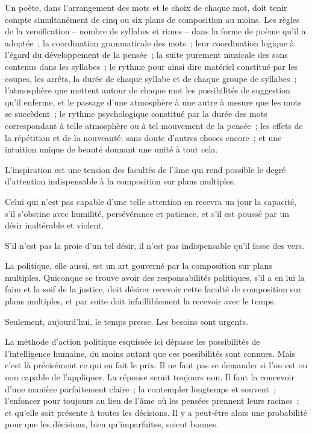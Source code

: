 \documentclass[french,twoside]{book} %
\begin{document}
Un poète, dans l'arrangement des mots et le choix de chaque mot, doit tenir compte simultanément de cinq ou six plans de composition au moins. Les règles de la versification – nombre de syllabes et rimes – dans la forme de poème qu'il a adoptée ; la coordination grammaticale des mots ; leur coordination logique à l'égard du développement de la pensée ; la suite purement musicale des sons contenus dans les syllabes ; le rythme pour ainsi dire matériel constitué par les coupes, les arrêts, la durée de chaque syllabe et de chaque groupe de syllabes ; l'atmosphère que mettent autour de chaque mot les possibilités de suggestion qu'il enferme, et le passage d'une atmosphère à une autre à mesure que les mots se succèdent ; le rythme psychologique constitué par la durée des mots correspondant à telle atmosphère ou à tel mouvement de la pensée ; les effets de la répétition et de la nouveauté; sans doute d'autres choses encore ; et une intuition unique de beauté donnant une unité à tout cela.\par
L'inspiration est une tension des facultés de l'âme qui rend possible le degré d'attention indispensable à la composition sur plans multiples.\par
Celui qui n'est pas capable d'une telle attention en recevra un jour la capacité, s'il s'obstine avec humilité, persévérance et patience, et s'il est poussé par un désir inaltérable et violent.\par
S'il n'est pas la proie d'un tel désir, il n'est pas indispensable qu'il fasse des vers.\par
La politique, elle aussi, est un art gouverné par la composition sur plans multiples. Quiconque se trouve avoir des responsabilités politiques, s'il a en lui la faim et la soif de la justice, doit désirer recevoir cette faculté de composition sur plans multiples, et par suite doit infailliblement la recevoir avec le temps.\par
Seulement, aujourd'hui, le temps presse. Les besoins sont urgents.\par
La méthode d'action politique esquissée ici dépasse les possibilités de l'intelligence humaine, du moins autant que ces possibilités sont connues. Mais c'est là précisément ce qui en fait le prix. Il ne faut pas se demander si l'on est ou non capable de l'appliquer. La réponse serait toujours non. Il faut la concevoir d'une manière parfaitement claire ; la contempler longtemps et souvent ; l'enfoncer pour toujours au lieu de l'âme où les pensées prennent leurs racines ; et qu'elle soit présente à toutes les décisions. Il y a peut-être alors une probabilité pour que les décisions, bien qu'imparfaites, soient bonnes.\par
\end{document}
